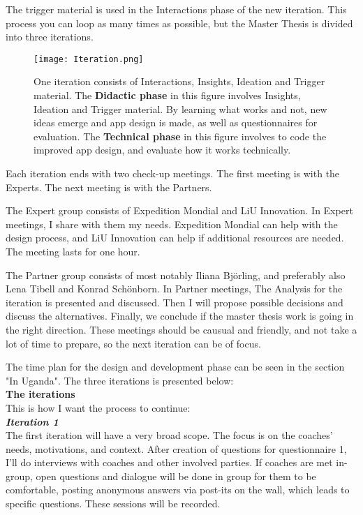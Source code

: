 The trigger material is used in the Interactions phase of the new iteration. This process you can loop as many times as possible, but the Master Thesis is divided into three iterations.

\begin{figure}[h]
    \centering
    \texttt{[image: Iteration.png]}
    \caption{One iteration consists of Interactions, Insights, Ideation and Trigger material. The \textbf{Didactic phase} in this figure involves Insights, Ideation and Trigger material. By learning what works and not, new ideas emerge and app design is made, as well as questionnaires for evaluation. The \textbf{Technical phase} in this figure involves to code the improved app design, and evaluate how it works technically.}
    \label{fig:iteration}
\end{figure}

Each iteration ends with two check-up meetings. The first meeting is with the Experts. The next meeting is with the Partners.

The Expert group consists of Expedition Mondial and LiU Innovation. In Expert meetings, I share with them my needs. Expedition Mondial can help with the design process, and LiU Innovation can help if additional resources are needed. The meeting lasts for one hour.

The Partner group consists of most notably Iliana Björling, and preferably also Lena Tibell and Konrad Schönborn. In Partner meetings, The Analysis for the iteration is presented and discussed. Then I will propose possible decisions and discuss the alternatives. %
Finally, we conclude if the master thesis work is going in the right direction. These meetings should be causual and friendly, and not take a lot of time to prepare, so the next iteration can be of focus. %

The time plan for the design and development phase can be seen in the section "In Uganda". The three iterations is presented below: \\

\textbf{The iterations} \\
This is how I want the process to continue:\\

	\textit{\textbf{Iteration 1}}\\
    The first iteration will have a very broad scope. The focus is on the coaches' needs, motivations, and context.  After creation of questions for questionnaire 1, I'll do interviews with coaches and other involved parties. If coaches are met in-group, open questions and dialogue will be done in group for them to be comfortable, posting anonymous answers via post-its on the wall, which leads to specific questions. These sessions will be recorded.

